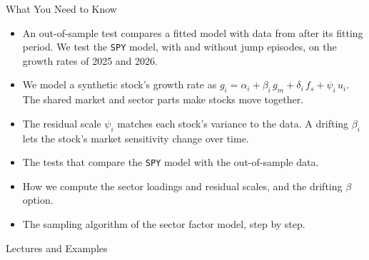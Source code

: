 \documentclass[aspectratio=169,11pt]{beamer}
\newcommand{\repo}{https://github.com/varnerlab/CHEME-5660-CourseRepository-Fall-2026/blob/main/lectures/week-13/L13b}
\begin{document}
\begin{frame}{What You Need to Know}
  \vspace{0.3em}
  {\large\textbf{}}
  \begin{itemize}\setlength{\itemsep}{0.15em}
    \item An out-of-sample test compares a fitted model with data from after its fitting
      period. We test the \texttt{SPY} model, with and without jump episodes, on the growth
      rates of 2025 and 2026.
    \item We model a synthetic stock's growth rate as
      $g_{i}=\alpha_{i}+\beta_{i}\,g_{m}+\delta_{i}\,f_{s}+\psi_{i}\,u_{i}$.
      The shared market and sector parts make stocks move together.
    \item The residual scale $\psi_i$ matches each stock's variance to the data. A drifting $\beta_i$
      lets the stock's market sensitivity change over time.
  \end{itemize}

  \vspace{0.3em}
  {\large\textbf{} }
  \begin{itemize}\setlength{\itemsep}{0.2em}
    \item The tests that compare the \texttt{SPY} model with the out-of-sample data.
    \item How we compute the sector loadings and residual scales, and the drifting $\beta$ option.
    \item The sampling algorithm of the sector factor model, step by step.
  \end{itemize}
\end{frame}

\begin{frame}{Lectures and Examples}
  \vspace{0.3em}
  {\normalsize\textbf{}\par\small
  \href{\repo/CHEME-5660-L13b-Lecture-JumpHMM-ManyStocks-Fall-2026.ipynb}{}}

  \vspace{0.6em}
  {\normalsize\textbf{}\par\small
  \href{\repo/CHEME-5660-L13b-Example-JumpHMM-SPY-OutOfSample-Fall-2026.ipynb}{}\par
  \href{\repo/CHEME-5660-L13b-Example-JumpHMM-SectorFactor-Fall-2026.ipynb}{}}
\end{frame}
\end{document}
